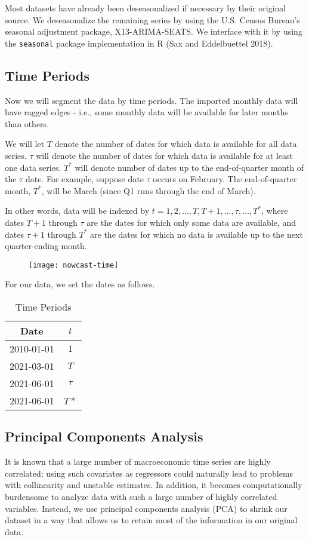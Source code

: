 \documentclass[11pt, letterpaper]{article}\usepackage[]{graphicx}\usepackage[]{color}
\begin{document}
Most datasets have already been deseasonalized if necessary by their original source. We deseasonalize the remaining series by using the U.S. Census Bureau's seasonal adjustment package, X13-ARIMA-SEATS. We interface with it by using the \texttt{seasonal} package implementation in R (Sax and Eddelbuettel 2018).

\subsection{Time Periods}
Now we will segment the data by time periods. The imported monthly data will have ragged edges - i.e., some monthly data will be available for later months than others.

We will let $T$ denote the number of dates for which data is available for all data series. $\tau$ will denote the number of dates for which data is available for at least one data series. $T^*$ will denote number of dates up to the end-of-quarter month of the $\tau$ date. For example, suppose date $\tau$ occurs on February. The end-of-quarter month, $T^*$, will be March (since Q1 runs through the end of March). 

In other words, data will be indexed by $t = 1, 2, \dots, T, T+1, \dots, \tau, \dots, T^*$, where dates $T + 1$ through $\tau$ are the dates for which only some data are available, and dates $\tau + 1$ through $T^*$ are the dates for which no data is available up to the next quarter-ending month.
\begin{figure}[H]
\texttt{[image: nowcast-time]}
\centering
\end{figure}
For our data, we set the dates as follows.
\begin{table}[H]
\centering
\begingroup\footnotesize
\begin{tabular}{cc}
  \hline
Date & $t$ \\ 
  \hline
2010-01-01 & $1$ \\ 
  2021-03-01 & $T$ \\ 
  2021-06-01 & $\tau$ \\ 
  2021-06-01 & $T*$ \\ 
   \hline
\end{tabular}
\endgroup
\caption{Time Periods} 
\end{table}


\subsection{Principal Components Analysis}
It is known that a large number of macroeconomic time series are highly correlated; using such covariates as regressors could naturally lead to problems with collinearity and unstable estimates. In addition, it becomes computationally burdensome to analyze data with such a large number of highly correlated variables. Instead, we use principal components analysis (PCA) to shrink our dataset in a way that allows us to retain most of the information in our original data.
\end{document}
